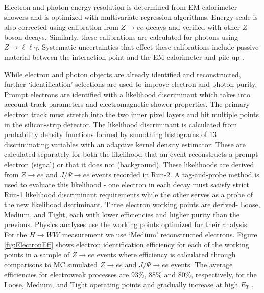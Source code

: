 Electron and photon energy resolution is determined from EM calorimeter showers and is optimized with multivariate regression algorithms. Energy scale is also corrected using calibration from $Z\rightarrow ee$ decays and verified with other $Z$-boson decays. Similarly, these calibrations are calculated for photons using $Z\rightarrow \ell\ell\gamma$. Systematic uncertainties that effect these calibrations include passive material between the interaction point and the EM calorimeter and pile-up \cite{ElectronPhotonPerformance}. 

While electron and photon objects are already identified and reconstructed, further `identification' selections are used to improve electron and photon purity. Prompt electrons are identified with a likelihood discriminant which takes into account track parameters and electromagnetic shower properties. The primary electron track must stretch into the two inner pixel layers and hit multiple points in the silicon-strip detector. The likelihood discriminant is calculated from probability density functions formed by smoothing histograms of 13 discriminating variables with an adaptive kernel density estimator.  These are calculated separately for both the likelihood that an event reconstructs a prompt electron (signal) or that it does not (background). These likelihoods are derived from $Z\rightarrow ee$ and $J/\Psi\rightarrow ee$ events recorded in Run-2. A tag-and-probe method is used to evaluate this likelihood - one electron in each decay must satisfy strict Run-1 likelihood discriminant requirements while the other serves as a probe of the new likelihood dscriminant. Three electron working points are derived- Loose, Medium, and Tight, each with lower efficiencies and higher purity than the previous. Physics analyses use the working points optimized for their analysis. For the $H\rightarrow WW$ measurement we use `Medium' reconstructed electrons. Figure \ref{fig:ElectronEff} shows electron identification efficiency for each of the working points in a sample of $Z\rightarrow ee$ events where efficiency is calculated through comparisons to MC simulated $Z\rightarrow ee$ and $J/\Psi\rightarrow ee$ events. The average efficiencies for electroweak processes are 93\%, 88\% and 80\%, respectively, for the Loose, Medium, and Tight operating points and gradually increase at high $E_T$ \cite{ElectronPhotonPerformance}.

